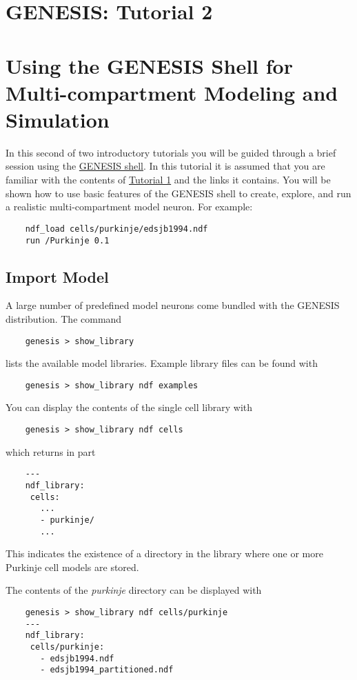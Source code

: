 \documentclass[12pt]{article}
\begin{document}
\section*{GENESIS: Tutorial 2}

\section*{Using the GENESIS Shell for\\Multi-compartment Modeling and Simulation}

In this second of two introductory tutorials you will be guided through a brief session using the \href{../gshell/gshell.pdf}{GENESIS shell}. In this tutorial it is assumed that you are familiar with the contents of \href{../tutorial1/tutorial1.pdf}{Tutorial 1} and the links it contains. You will be shown how to use basic features of the GENESIS shell to create, explore, and run a realistic multi-compartment model neuron. For example:
\begin{verbatim}
    ndf_load cells/purkinje/edsjb1994.ndf
    run /Purkinje 0.1
\end{verbatim}

\subsection*{Import Model}

A large number of predefined model neurons come bundled with the GENESIS distribution. The command
\begin{verbatim}
    genesis > show_library
\end{verbatim}
lists the available model libraries. Example library files can be found with
\begin{verbatim}
    genesis > show_library ndf examples
\end{verbatim}
You can display the contents of the single cell library with
\begin{verbatim}
    genesis > show_library ndf cells
\end{verbatim}
which returns in part
\begin{verbatim}
    ---
    ndf_library:
     cells:
       ...
       - purkinje/
       ...
\end{verbatim}
This indicates the existence of a directory in the library where one or more Purkinje cell models are stored.

The contents of the {\it purkinje} directory can be displayed with
\begin{verbatim}
    genesis > show_library ndf cells/purkinje
    ---
    ndf_library:
     cells/purkinje:
       - edsjb1994.ndf
       - edsjb1994_partitioned.ndf
\end{verbatim}
\end{document}
